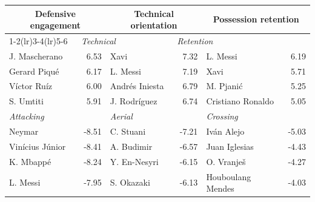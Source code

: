 
\begin{tabular}{lr@{\hspace{1.5em}}lr@{\hspace{1.5em}}lr}
\toprule
\multicolumn{2}{c}{Defensive engagement} & \multicolumn{2}{c}{Technical orientation} & \multicolumn{2}{c}{Possession retention} \\
\cmidrule(lr){1-2}\cmidrule(lr){3-4}\cmidrule(lr){5-6}
\multicolumn{2}{l}{\textit{Defensive}} & \multicolumn{2}{l}{\textit{Technical}} & \multicolumn{2}{l}{\textit{Retention}}\\
J. Mascherano & 6.53 & Xavi & 7.32 & L. Messi & 6.19\\
Gerard Piqué & 6.17 & L. Messi & 7.19 & Xavi & 5.71\\
Víctor Ruíz & 6.00 & Andrés Iniesta & 6.79 & M. Pjanić & 5.25\\
S. Umtiti & 5.91 & J. Rodríguez & 6.74 & Cristiano Ronaldo & 5.05\\
\midrule
\multicolumn{2}{l}{\textit{Attacking}} & \multicolumn{2}{l}{\textit{Aerial}} & \multicolumn{2}{l}{\textit{Crossing}}\\
Neymar & -8.51 & C. Stuani & -7.21 & Iván Alejo & -5.03\\
Vinícius Júnior & -8.41 & A. Budimir & -6.57 & Juan Iglesias & -4.43\\
K. Mbappé & -8.24 & Y. En-Nesyri & -6.15 & O. Vranješ & -4.27\\
L. Messi & -7.95 & S. Okazaki & -6.13 & Houboulang Mendes & -4.03\\
\bottomrule
\end{tabular}
